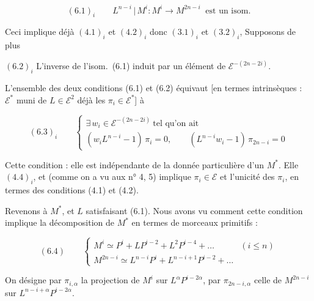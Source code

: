 
\[ (6.1)_{i} \qquad L^{n-i} \,|\, M^{i} \colon M^{i} \to M^{2n-i} \ \text{ est un isom.} \]

Ceci implique déjà $(4.1)_{i}$ et $(4.2)_{i}$ donc $(3.1)_{i}$ et $(3.2)_{i}$,
 Supposons de plus

$(6.2)_{i}$ \quad L'inverse de l'isom.\ (6.1)  induit par un élément de
$\mathcal{E}^{-(2n-2i)}$.


 L'ensemble des deux conditions (6.1) et (6.2) équivaut [en termes
intrinsèques : $\mathcal{E}^{*}$ muni de $L \in \mathcal{E}^{2}$ \ill{}
 déjà les $\pi_{i} \in \mathcal{E}^{*}$] à

\[ (6.3)_{i} \qquad \begin{cases} \exists\, w_{i} \in \mathcal{E}^{-(2n-2i)} \ \text{tel qu'on ait} \\[2pt] (w_{i} L^{n-i} - 1)\, \pi_{i} = 0 , \qquad (L^{n-i} w_{i} - 1)\, \pi_{2n-i} = 0 \end{cases} \]

Cette condition \ill{} : elle est indépendante de la donnée particulière d'un
$M^{*}$.  Elle \ill{} $(4.4)_{i}$, et
(comme on a vu aux n° 4, 5) implique $\pi_{i} \in \mathcal{E}$ et l'unicité des
$\pi_{i}$, en termes des conditions (4.1) et (4.2).

Revenons à $M^{*}$, et $L$ satisfaisant (6.1). Nous avons vu comment
\struck{\ill{}} cette condition implique la décomposition de $M^{*}$ en termes de
morceaux primitifs :

\[ (6.4) \qquad \begin{cases} M^{i} \simeq P^{i} + L P^{i-2} + L^{2} P^{i-4} + \ldots & (i \leqslant n) \\[2pt] M^{2n-i} \simeq L^{n-i} P^{i} + L^{n-i+1} P^{i-2} + \ldots \end{cases} \]

On désigne par $\pi_{i,\alpha}$ la projection de $M^{i}$ sur
$L^{\alpha} P^{i-2\alpha}$, par $\pi_{2n-i,\alpha}$ celle de $M^{2n-i}$ sur
$L^{n-i+\alpha} P^{i-2\alpha}$.

